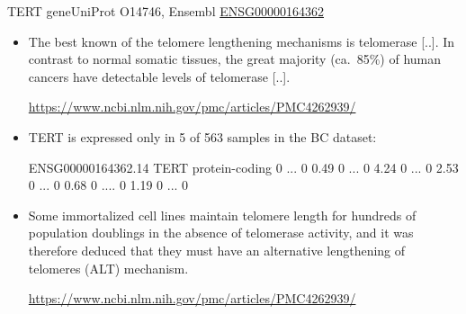 \documentclass[onepage]{beamer}
\begin{document}
\begin{frame}[t]{TERT gene}{UniProt O14746, Ensembl \href{http://asia.ensembl.org/Homo_sapiens/Gene/Ontologies/biological_process?g=ENSG00000164362;r=5:1253147-1295069}{ENSG00000164362}}

	\begin{itemize}
	\item
		The best known of the telomere lengthening mechanisms is telomerase [..].
		In contrast to normal somatic tissues, the great majority (ca.~85\%) of human cancers have detectable levels of telomerase [..].

		{\tiny \url{https://www.ncbi.nlm.nih.gov/pmc/articles/PMC4262939/}}
	
	\item
		TERT is expressed only in 5 of 563 samples in the BC dataset:
		
		{
			\tiny
			ENSG00000164362.14 TERT protein-coding 0 ... 0 0.49 0 ... 0 4.24 0 ... 0 2.53 0 ... 0 0.68 0 .... 0 1.19 0 ... 0
		}
	
	\item
		Some immortalized cell lines maintain telomere length for hundreds of population doublings in the absence of telomerase activity, and it was therefore deduced that they must have an alternative lengthening of telomeres (ALT) mechanism.
		
		{\tiny \url{https://www.ncbi.nlm.nih.gov/pmc/articles/PMC4262939/}}
	\end{itemize}

\end{frame}

\end{document}
